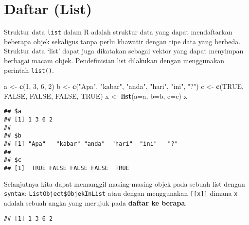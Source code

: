 \documentclass[
]{book}
\newenvironment{Shaded}{\begin{snugshade}}{\end{snugshade}}
\newcommand{\DataTypeTok}[1]{\textcolor[rgb]{0.13,0.29,0.53}{#1}}
\newcommand{\DecValTok}[1]{\textcolor[rgb]{0.00,0.00,0.81}{#1}}
\newcommand{\KeywordTok}[1]{\textcolor[rgb]{0.13,0.29,0.53}{\textbf{#1}}}
\newcommand{\NormalTok}[1]{#1}
\newcommand{\OperatorTok}[1]{\textcolor[rgb]{0.81,0.36,0.00}{\textbf{#1}}}
\newcommand{\OtherTok}[1]{\textcolor[rgb]{0.56,0.35,0.01}{#1}}
\newcommand{\StringTok}[1]{\textcolor[rgb]{0.31,0.60,0.02}{#1}}
\begin{document}
\hypertarget{list}{%
\section{Daftar (List)}\label{list}}

Struktur data \texttt{list} dalam R adalah struktur data yang dapat mendaftarkan beberapa objek sekaligus tanpa perlu khawatir dengan tipe data yang berbeda. Struktur data `list' dapat juga dikatakan sebagai vektor yang dapat menyimpan berbagai macam objek. Pendefinisian list dilakukan dengan menggunakan perintah \texttt{list()}.

\begin{Shaded}
\begin{Highlighting}[]
\NormalTok{a <-}\StringTok{ }\KeywordTok{c}\NormalTok{(}\DecValTok{1}\NormalTok{, }\DecValTok{3}\NormalTok{, }\DecValTok{6}\NormalTok{, }\DecValTok{2}\NormalTok{)}
\NormalTok{b <-}\StringTok{ }\KeywordTok{c}\NormalTok{(}\StringTok{"Apa"}\NormalTok{, }\StringTok{"kabar"}\NormalTok{, }\StringTok{"anda"}\NormalTok{, }\StringTok{"hari"}\NormalTok{, }\StringTok{"ini"}\NormalTok{, }\StringTok{"?"}\NormalTok{)}
\NormalTok{c <-}\StringTok{ }\KeywordTok{c}\NormalTok{(}\OtherTok{TRUE}\NormalTok{, }\OtherTok{FALSE}\NormalTok{, }\OtherTok{FALSE}\NormalTok{, }\OtherTok{FALSE}\NormalTok{, }\OtherTok{TRUE}\NormalTok{)}
\NormalTok{x <-}\StringTok{ }\KeywordTok{list}\NormalTok{(}\DataTypeTok{a=}\NormalTok{a, }\DataTypeTok{b=}\NormalTok{b, }\DataTypeTok{c=}\NormalTok{c)}
\NormalTok{x}
\end{Highlighting}
\end{Shaded}

\begin{verbatim}
## $a
## [1] 1 3 6 2
## 
## $b
## [1] "Apa"   "kabar" "anda"  "hari"  "ini"   "?"    
## 
## $c
## [1]  TRUE FALSE FALSE FALSE  TRUE
\end{verbatim}

Selanjutnya kita dapat memanggil masing-masing objek pada sebuah list dengan \texttt{syntax}: \texttt{ListObject\$ObjekInList} atau dengan menggunakan \texttt{{[}{[}x{]}{]}} dimana \texttt{x} adalah sebuah angka yang merujuk pada \textbf{daftar ke berapa}.

\begin{Shaded}
\end{Shaded}

\begin{verbatim}
## [1] 1 3 6 2
\end{verbatim}
\end{document}
